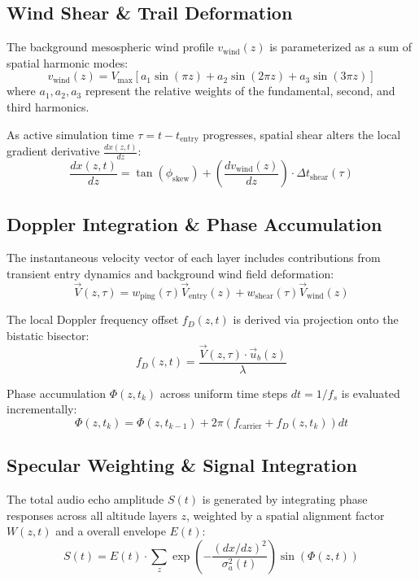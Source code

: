 \documentclass[10pt,twocolumn,a4paper]{article}
\begin{document}
\subsection{Wind Shear \& Trail Deformation}
The background mesospheric wind profile $v_{\mathrm{wind}}(z)$ is parameterized as a sum of spatial harmonic modes:
\begin{equation}
v_{\mathrm{wind}}(z) = V_{\mathrm{max}} \left[ a_1 \sin(\pi z) + a_2 \sin(2\pi z) + a_3 \sin(3\pi z) \right]
\end{equation}
where $a_1, a_2, a_3$ represent the relative weights of the fundamental, second, and third harmonics.

As active simulation time $\tau = t - t_{\mathrm{entry}}$ progresses, spatial shear alters the local gradient derivative $\frac{dx(z, t)}{dz}$:
\begin{equation}
\frac{dx(z, t)}{dz} = \tan(\phi_{\mathrm{skew}}) + \left(\frac{d v_{\mathrm{wind}}(z)}{dz}\right) \cdot \Delta t_{\mathrm{shear}}(\tau)
\end{equation}

\subsection{Doppler Integration \& Phase Accumulation}
The instantaneous velocity vector of each layer includes contributions from transient entry dynamics and background wind field deformation:
\begin{equation}
\vec{V}(z, \tau) = w_{\mathrm{ping}}(\tau)\vec{V}_{\mathrm{entry}}(z) + w_{\mathrm{shear}}(\tau)\vec{V}_{\mathrm{wind}}(z)
\end{equation}

The local Doppler frequency offset $f_D(z, t)$ is derived via projection onto the bistatic bisector:
\begin{equation}
f_D(z, t) = \frac{\vec{V}(z, \tau) \cdot \vec{u}_b(z)}{\lambda}
\end{equation}

Phase accumulation $\Phi(z, t_k)$ across uniform time steps $dt = 1/f_s$ is evaluated incrementally:
\begin{equation}
\Phi(z, t_k) = \Phi(z, t_{k-1}) + 2\pi \left( f_{\mathrm{carrier}} + f_D(z, t_k) \right) dt
\end{equation}

\subsection{Specular Weighting \& Signal Integration}
The total audio echo amplitude $S(t)$ is generated by integrating phase responses across all altitude layers $z$, weighted by a spatial alignment factor $W(z, t)$ and a overall envelope $E(t)$:
\begin{equation}
S(t) = E(t) \cdot \sum_{z} \exp\left( -\frac{(dx/dz)^2}{\sigma_a^2(t)} \right) \sin\left(\Phi(z, t)\right)
\end{equation}
\end{document}
